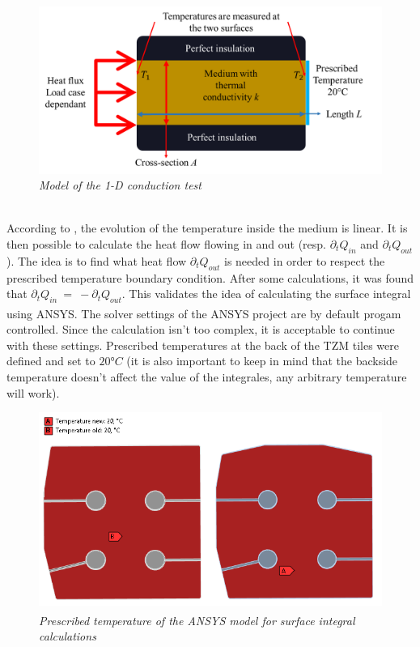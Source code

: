 \\
\begin{figure}[h!]
    \label{fig_5_2} 
    \centering
    \includegraphics[width=.9\textwidth]{figures/modelforFEcalculationofsurfaceintegral.png}
    \caption{\it Model of the 1-D conduction test}
\end{figure}
\\
\break
\normalsize{\indent According to , the evolution of the temperature inside the medium is linear. It is then possible to calculate the heat flow flowing in and out (resp. $\partial_t Q_{in}$ and $\partial_t Q_{out}$). The idea is to find what heat flow $\partial_t Q_{out}$ is needed in order to respect the prescribed temperature boundary condition. After some calculations, it was found that $\partial_t Q_{in} \ = \ - \partial_t Q_{out}$. This validates the idea of calculating the surface integral using ANSYS\textsuperscript{\textregistered}. The solver settings of the ANSYS\textsuperscript{\textregistered} project are by default progam controlled. Since the calculation isn't too complex, it is acceptable to continue with these settings. Prescribed temperatures at the back of the \acrshort{TZM} tiles were defined and set to $20 \si{\degree} C$ (it is also important to keep in mind that the backside temperature doesn't affect the value of the integrales, any arbitrary temperature will work).}
\\
\begin{figure}[h!]
    \label{fig_5_3} 
    \centering
    \includegraphics[width=1\textwidth]{figures/surfaceintegraleansysTEMPBC.png}
    \caption{\it Prescribed temperature of the ANSYS\textsuperscript{\textregistered} model for surface integral calculations}
\end{figure}
